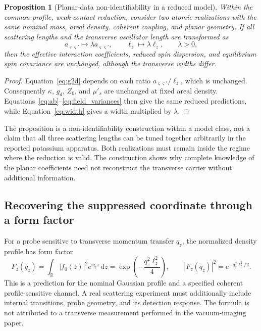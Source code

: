 \documentclass[11pt,a4paper]{article}
\newtheorem{proposition}{Proposition}[section]
\theoremstyle{definition}
\theoremstyle{remark}
\newcommand{\dd}{\mathrm{d}}
\newcommand{\ii}{\mathrm{i}}
\newcommand{\R}{\mathbb{R}}
\newcommand{\musp}{\mu'_s}
\newcommand{\lop}{\ell_z}
\begin{document}
\begin{proposition}[Planar-data non-identifiability in a reduced model]
Within the common-profile, weak-contact reduction, consider two atomic realizations with the same nominal mass, areal density, coherent coupling, and planar geometry. If all scattering lengths and the transverse oscillator length are transformed as
\begin{equation}
 a_{\varsigma\varsigma'}\longmapsto\lambda a_{\varsigma\varsigma'},
 \qquad \lop\longmapsto\lambda\lop,
 \qquad \lambda>0,
 \label{eq:degeneracy}
\end{equation}
then the effective interaction coefficients, reduced spin dispersion, and equilibrium spin covariance are unchanged, although the transverse widths differ.
\end{proposition}
\begin{proof}
Equation~\eqref{eq:g2d} depends on each ratio $a_{\varsigma\varsigma'}/\lop$, which is unchanged. Consequently $\kappa$, $g_d$, $Z_0$, and $\musp$ are unchanged at fixed areal density. Equations~\eqref{eq:ab}--\eqref{eq:field_variances} then give the same reduced predictions, while Equation~\eqref{eq:width} gives a width multiplied by $\lambda$.
\end{proof}

The proposition is a non-identifiability construction within a model class, not a claim that all three scattering lengths can be tuned together arbitrarily in the reported potassium apparatus. Both realizations must remain inside the regime where the reduction is valid. The construction shows why complete knowledge of the planar coefficients need not reconstruct the transverse carrier without additional information.

\subsection{Recovering the suppressed coordinate through a form factor}
For a probe sensitive to transverse momentum transfer $q_z$, the normalized density profile has form factor
\begin{equation}
 F_z(q_z)=\int_{\R}|f_0(z)|^2e^{\ii q_zz}\,\dd z
 =\exp\!\left(-\frac{q_z^2\lop^2}{4}\right),
 \qquad |F_z(q_z)|^2=e^{-q_z^2\lop^2/2}.
 \label{eq:formfactor}
\end{equation}
This is a prediction for the nominal Gaussian profile and a specified coherent profile-sensitive channel. A real scattering experiment must additionally include internal transitions, probe geometry, and its detection response. The formula is not attributed to a transverse measurement performed in the vacuum-imaging paper.
\end{document}
